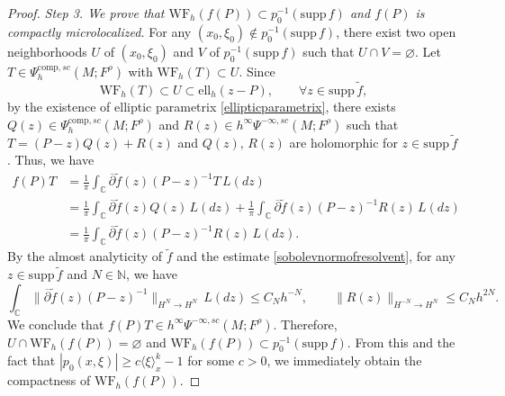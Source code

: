\documentclass[10pt,a4paper]{amsart}
\newcommand\C{\ensuremath{\mathbb{C}}}
\begin{document}
\begin{proof}
\emph{Step 3. We prove that $\mathrm{WF}_{h}(f(P))\subset p_{0}^{-1}(\mathrm{supp}\,f)$ and $f(P)$ is compactly microlocalized.}  For any $(x_0,\xi_0)\notin p_{0}^{-1}(\mathrm{supp}\,f)$, there exist two open neighborhoods $U$ of $(x_0,\xi_0)$ and $V$ of $p_{0}^{-1}(\mathrm{supp}\,f)$ such that $U \cap V=\varnothing$. Let $T \in \Psi^{\mathrm{comp},sc}_{h}(M;F^\rho)$ with $\mathrm{WF}_{h}(T)\subset U$. Since 
\begin{equation*}
    \mathrm{WF}_{h}(T)\subset U\subset \mathrm{ell}_{h}(z-P), \qquad \forall z \in \mathrm{supp}\,\widetilde{f},
\end{equation*}
by the existence of elliptic parametrix \eqref{ellipticparametrix}, there exists $Q(z)\in \Psi^{\mathrm{comp},sc}_{h}(M;F^\rho)$ and $R(z)\in h^{\infty}\Psi^{-\infty,sc}(M;F^\rho)$ such that $T=(P-z)Q(z)+R(z)$ and $Q(z),\,R(z)$ are holomorphic for $z \in \mathrm{supp}\,\widetilde{f}$. Thus, we have
\begin{equation}
\begin{aligned}
f(P)T&=\frac{1}{\pi}\int_{\C}\overline{\partial}\widetilde{f}(z)(P-z)^{-1}T \, L(dz)\\
&=\frac{1}{\pi}\int_{\C}\overline{\partial}\widetilde{f}(z)Q(z)\,L(dz) + \frac{1}{\pi}\int_{\C}\overline{\partial}\widetilde{f}(z)(P-z)^{-1}R(z)\,L(dz)\\
&=\frac{1}{\pi}\int_{\C}\overline{\partial}\widetilde{f}(z)(P-z)^{-1}R(z)\, L(dz).
\end{aligned}
\end{equation}
By the almost analyticity of $\widetilde{f}$ and the estimate \eqref{sobolevnormofresolvent}, for any $z \in \mathrm{supp}\,\widetilde{f}$ and $N\in \mathbb{N}$, we have
\begin{equation*}
    \int_{\C}\|\overline{\partial}\widetilde{f}(z)(P-z)^{-1}\|_{H^N\to H^{N}}\,L(dz) \leq C_Nh^{-N},\qquad \|R(z)\|_{H^{-N}\to H^{N}}\leq C_Nh^{2N}.
\end{equation*}
We conclude that $f(P)T \in h^{\infty}\Psi^{-\infty,sc}(M;F^\rho)$. Therefore, $U\cap \mathrm{WF}_{h}(f(P))=\varnothing$ and $\mathrm{WF}_{h}(f(P))\subset p_0^{-1}(\mathrm{supp}\,f)$. From this and the fact that $|p_{0}(x,\xi)|\geq c\langle \xi \rangle_{x}^k-1$ for some $c>0$, we immediately obtain the compactness of $\mathrm{WF}_{h}(f(P))$.
\end{proof}
\end{document}
